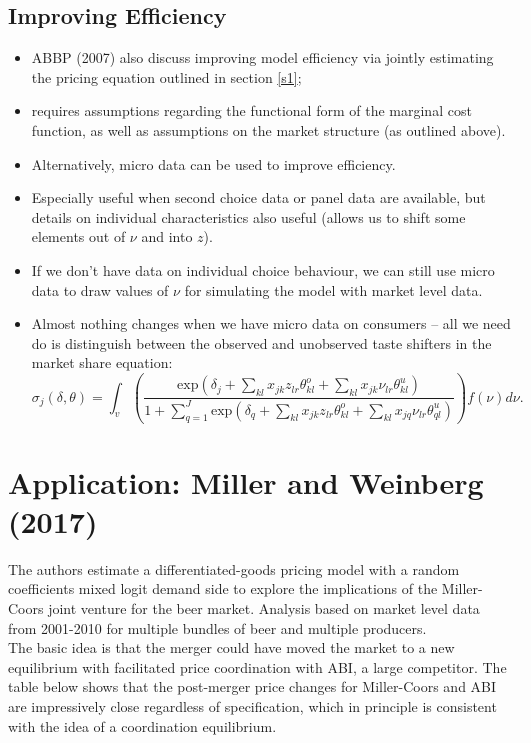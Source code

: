 \documentclass[11pt]{article}
\numberwithin{equation}{section}
\begin{document}
\subsection{Improving Efficiency}
	\begin{itemize}
		\item ABBP (2007) also discuss improving model efficiency via jointly estimating the pricing equation outlined in section \ref{s1};
		\item requires assumptions regarding the functional form of the marginal cost function, as well as assumptions on the market structure (as outlined above).
		\item Alternatively, micro data can be used to improve efficiency.
		\item Especially useful when second choice data or panel data are available, but details on individual characteristics also useful (allows us to shift some elements out of $\nu$ and into $z$).
		\item If we don't have data on individual choice behaviour, we can still use micro data to draw values of $\nu$ for simulating the model with market level data.
		\item Almost nothing changes when we have micro data on consumers -- all we need do is distinguish between the observed and unobserved taste shifters in the market share equation:
		\begin{equation}
		\sigma_j(\delta,\theta) = \int_{v}\left(\frac{\text{exp}(\delta_j + \sum_{kl}x_{jk}z_{lr}\theta_{kl}^o + \sum_{kl}x_{jk}\nu_{lr}\theta_{kl}^u)}{1 + \sum_{q=1}^{J}\text{exp}(\delta_q  + \sum_{kl}x_{jk}z_{lr}\theta_{kl}^o+ \sum_{kl}x_{jq}\nu_{lr}\theta_{ql}^u)}\right) f(\nu)d\nu.
\end{equation}
\end{itemize}

\section{Application: Miller and Weinberg (2017)}

The authors estimate a differentiated-goods pricing model with a random coefficients mixed logit demand side to explore the implications of the Miller-Coors joint venture for the beer market.
Analysis based on market level data from 2001-2010 for multiple bundles of beer and multiple producers. \\

The basic idea is that the merger could have moved the market to a new equilibrium with facilitated price coordination with ABI, a large competitor.
The table below shows that the post-merger price changes for Miller-Coors and ABI are impressively close regardless of specification, which in principle is consistent with the idea of a coordination equilibrium.
\end{document}
